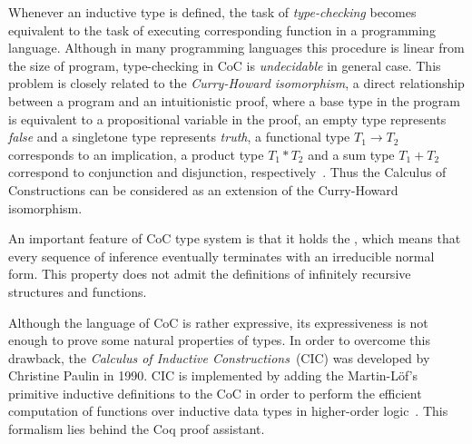 \documentclass[article]{aaltoseries}
\begin{document}

Whenever an inductive type is defined, the task of \textit{type-checking} becomes equivalent to the task of executing corresponding function in a programming language. Although in many programming languages this procedure is linear from the size of program, type-checking in CoC is \textit{undecidable} in general case. This problem is closely related to the \textit{Curry-Howard isomorphism}, a direct relationship between a program and an intuitionistic proof, where a base type in the program is equivalent to a propositional variable in the proof, an empty type represents \textit{false} and a singletone type represents \textit{truth}, a functional type $T_{1} \rightarrow T_{2}$ corresponds to an implication, a product type $T_{1} * T_{2}$ and a sum type $T_{1} + T_{2}$ correspond to conjunction and disjunction, respectively~\cite{Pierce2002}. Thus the Calculus of Constructions can be considered as an extension of the Curry-Howard isomorphism.

An important feature of CoC type system is that it holds the , which means that every sequence of inference eventually terminates with an irreducible normal form. This property does not admit the definitions of infinitely recursive structures and functions.

%

Although the language of CoC is rather expressive, its expressiveness is not enough to prove some natural properties of types. In order to overcome this drawback, the \textit{Calculus of Inductive Constructions}~(CIC) was developed by Christine Paulin in 1990. CIC is implemented by adding the Martin-Löf's primitive inductive definitions to the CoC in order to perform the efficient computation of functions over inductive data types in higher-order logic~\cite{Paulin15}. This formalism lies behind the Coq proof assistant.
\end{document}

